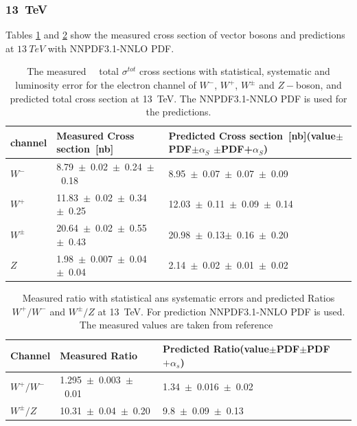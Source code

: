 \subsubsection{13~TeV}
Tables \ref{13_tab} and \ref{13_tab1} show the measured cross section of vector bosons and predictions at $13~TeV$ with NNPDF3.1-NNLO PDF. 
\begin{table}[H]
\caption{The measured~\cite{Aad_2016}~\cite{CMS:2015ois} total $\sigma^{tot}$ cross sections with statistical, systematic and luminosity error for the electron channel of $W^{-}$, $W^{+}$, $W^{\pm}$ and $Z-$boson, and predicted total cross section at 13~TeV. The NNPDF3.1-NNLO PDF is used for the predictions.}
\centering
\begin{tabular}{|l|p{6cm}|p{6cm}| }
\hline
channel&\bf Measured Cross section~[nb] &\bf Predicted Cross section~[nb]\newline (value$\pm$PDF$\pm\alpha_{S}$ $\pm$PDF+$\alpha_{S}$)\\
\hline
\hline
$W^{-}$&8.79~$\pm$~0.02~$\pm$~0.24~$\pm$~0.18&8.95~$\pm$~0.07~$\pm$~0.07~$\pm$~0.09\\
$W^{+}$&11.83~$\pm$~0.02~$\pm$~0.34~$\pm$~0.25&12.03~$\pm$~0.11~$\pm$~0.09~$\pm$~0.14\\
$W^{\pm}$&20.64~$\pm$~0.02~$\pm$~0.55~$\pm$~0.43&20.98~$\pm$~0.13$\pm$~0.16~$\pm$~0.20\\
\hline
\hline
$Z$&1.98~$\pm$~0.007~$\pm$~0.04~$\pm$~0.04&2.14~$\pm$~0.02~$\pm$~0.01~$\pm$~0.02\\
\hline
\end{tabular}
\label{13_tab}
\end{table}
 
\begin{table}[H]
\centering
\caption{Measured ratio with statistical ans systematic errors and predicted Ratios $W^{+}/W^{-}$ and $W^{\pm}/Z$ at 13~TeV. For prediction NNPDF3.1-NNLO PDF is used. The measured values are taken from reference~\cite{Aad_2016}}
\begin{tabular}{|l|p{6cm}|p{6cm}|}
\hline
Channel&\bf Measured Ratio&\bf Predicted Ratio\newline(value$\pm$PDF$\pm$PDF$+\alpha_{s}$)\\
\hline
\hline
$W^{+}/W^{-}$&1.295~$\pm$~0.003~$\pm$~0.01&1.34~$\pm$~0.016~$\pm$~0.02\\
$W^{\pm}/Z$&10.31~$\pm$~0.04~$\pm$~0.20&9.8~$\pm$~0.09~$\pm$~0.13\\
\hline
\end{tabular}
\label{13_tab1}
\end{table}

